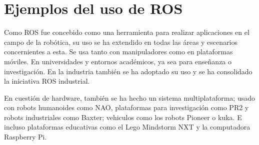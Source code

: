 \section{Ejemplos del uso de ROS}

Como ROS fue concebido como una herramienta para realizar aplicaciones en el campo de la robótica, su uso se ha extendido en todas las áreas y escenarios concernientes a esta. Se usa tanto con manipuladores como en plataformas móviles. En universidades y entornos académicos, ya sea para enseñanza o investigación. En la industria también se ha adoptado su uso y se ha consolidado la iniciativa ROS industrial.

En cuestión de hardware, también se ha hecho un sistema multiplataforma; usado con robots humanoides como NAO, plataformas para investigación como PR2 y  robots industriales como Baxter; vehiculos como los robots Pioneer o kuka. E incluso plataformas educativas como el Lego Mindstorm NXT y la computadora Raspberry Pi.
